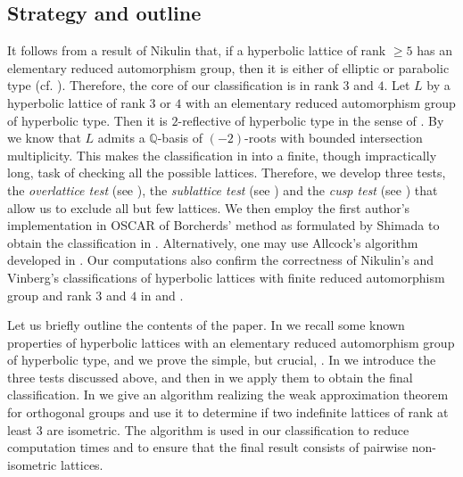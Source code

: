 \documentclass[11pt,letterpaper]{amsart}
\newcommand{\QQ}{\mathbb{Q}}
\theoremstyle{definition}
\theoremstyle{remark}
\begin{document}
\subsection*{Strategy and outline}
It follows from a result of Nikulin \cite[Theorem 9.1.1]{nikulin.factor.groups} that, if a hyperbolic lattice of rank $\ge 5$ has an elementary reduced automorphism group, then it is either of elliptic or parabolic type (cf. \cite[Theorem~3.9]{brandhorst.mezzedimi}). Therefore, the core of our classification is in rank $3$ and $4$. Let $L$ by a hyperbolic lattice of rank $3$ or $4$ with an elementary reduced automorphism group of hyperbolic type. Then it is $2$-reflective of hyperbolic type in the sense of \cite[Definition 2]{nikulin.interesting}. By \cite[Lemma~1]{nikulin.interesting} we know that $L$ admits a $\QQ$-basis of $(-2)$-roots with bounded intersection multiplicity. This makes the classification in  into a finite, though impractically long, task of checking all the possible lattices. Therefore, we develop three tests, the \emph{overlattice test} (see ), the \emph{sublattice test} (see ) and the \emph{cusp test} (see ) that allow us to exclude all but few lattices. We then employ the first author's implementation in OSCAR \cite{OSCAR} of Borcherds' method \cite{shimada.borcherds} as formulated by Shimada to obtain the classification in . Alternatively, one may use Allcock's algorithm developed in \cite{allcock.alternative}. Our computations also confirm the correctness of Nikulin's and Vinberg's classifications of hyperbolic lattices with finite reduced automorphism group and rank $3$ and $4$ in \cite{nikulin.finite.aut.3} and \cite{vinberg.finite.aut.4}. 

Let us briefly outline the contents of the paper. In  we recall some known properties of hyperbolic lattices with an elementary reduced automorphism group of hyperbolic type, and we prove the simple, but crucial, . In  we introduce the three tests discussed above, and then in  we apply them to obtain the final classification. 
In  we give an algorithm realizing the weak approximation theorem for orthogonal groups and use it to determine if two indefinite lattices of rank at least $3$ are isometric. The algorithm is used in our classification to reduce computation times and to ensure that the final result consists of pairwise non-isometric lattices. 
\end{document}
